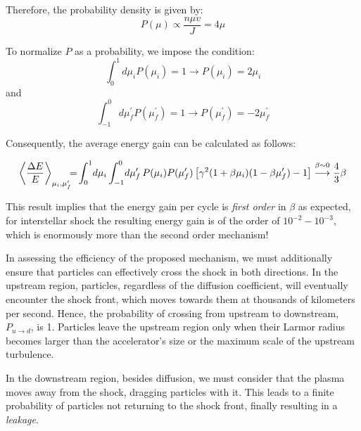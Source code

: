 Therefore, the probability density is given by:
%
\begin{equation}
P(\mu) \propto \frac{n \mu v}{J} = 4 \mu
\end{equation}

To normalize \( P \) as a probability, we impose the condition:
%
\begin{equation}
\int_0^1 d\mu_i P(\mu_i) = 1 \rightarrow P(\mu_i) = 2\mu_i
\end{equation}
%
and
%
\begin{equation}
\int_{-1}^0 d\mu^\prime_f P(\mu^\prime_f) = 1 \rightarrow P(\mu^\prime_f) = -2\mu^\prime_f
\end{equation}


Consequently, the average energy gain can be calculated as follows:
%
\begin{remark}
\begin{equation}\label{eq:firstorderxi}
\left\langle \frac{\Delta E}{E} \right\rangle_{\mu_i,\mu_f^\prime} \!\!\! = \! \int_0^1 \! d\mu_i \int_{-1}^0 \! d\mu^\prime_f \, P(\mu_i)P(\mu_f^\prime)\left[ \gamma^2(1+\beta\mu_i)(1-\beta\mu_f^\prime)-1 \right] 
\oset{\beta \sim 0}{\longrightarrow} \frac{4}{3} \beta 
\end{equation}
\end{remark}

This result implies that the energy gain per cycle is \emph{first order} in $\beta$ as expected, for interstellar shock the resulting energy gain is of the order of \( 10^{-2}-10^{-3} \), which is enormously more than the second order mechanism! 

In assessing the efficiency of the proposed mechanism, we must additionally ensure that particles can effectively cross the shock in both directions. 
In the upstream region, particles, regardless of the diffusion coefficient, will eventually encounter the shock front, which moves towards them at thousands of kilometers per second. Hence, the probability of crossing from upstream to downstream, \( P_{u \rightarrow d} \), is 1. Particles leave the upstream region only when their Larmor radius becomes larger than the accelerator's size or the maximum scale of the upstream turbulence.

In the downstream region, besides diffusion, we must consider that the plasma moves away from the shock, dragging particles with it. This leads to a finite probability of particles not returning to the shock front, finally resulting in a \emph{leakage}. 

